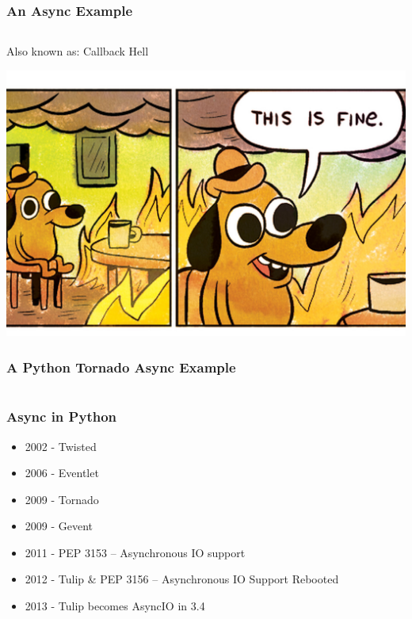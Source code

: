 \documentclass{beamer}
\begin{document}
\begin{frame}[fragile]
  \frametitle{An Async Example}
  \inputminted[fontsize=\footnotesize]{javascript}{code/async.js}
\end{frame}


\begin{frame}
  Also known as: Callback Hell
 \begin{center}
 \includegraphics[scale=0.20,keepaspectratio=true]{./thisisfine.jpeg}
 \end{center}
\end{frame}

\begin{frame}[fragile]
  \frametitle{A Python Tornado Async Example}
  \inputminted[fontsize=\footnotesize]{python}{code/tornado1.py}
\end{frame}

\begin{frame}
  \frametitle{Async in Python}
  \begin{itemize}
    \item 2002 - Twisted
    \item 2006 - Eventlet
    \item 2009 - Tornado
    \item 2009 - Gevent
    \item 2011 - PEP 3153 -- Asynchronous IO support
    \item 2012 - Tulip \& PEP 3156 -- Asynchronous IO Support Rebooted
    \item 2013 - Tulip becomes AsyncIO in 3.4
  \end{itemize}
\end{frame}
\end{document}

